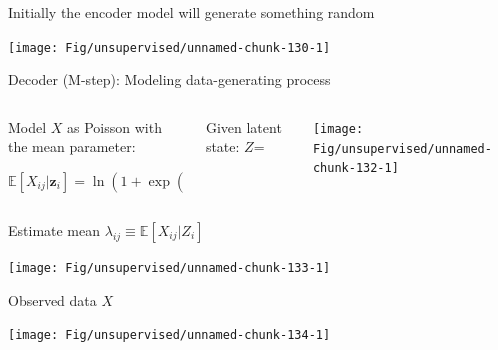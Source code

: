 \documentclass[
  ignorenonframetext,
  aspectratio=169]{beamer}
\begin{document}
\begin{frame}{Initially the encoder model will generate something
random}
\protect\hypertarget{initially-the-encoder-model-will-generate-something-random}{}
\scriptsize

\begin{center}\texttt{[image: Fig/unsupervised/unnamed-chunk-130-1]} \end{center}

\normalsize
\end{frame}

\begin{frame}{Decoder (M-step): Modeling data-generating process}
\protect\hypertarget{decoder-m-step-modeling-data-generating-process}{}
\scriptsize

\normalsize

\begin{columns}[T]
\begin{column}{.5\textwidth}
Model \(X\) as Poisson with the mean parameter:

\(\mathbb{E}\!\left[X_{ij} | \mathbf{z}_{i} \right] = \ln\left( 1 + \exp\left( \sum_{k} Z_{ik} W_{kj} \right) \right)\)
\end{column}

\begin{column}{.25\textwidth}
Given latent state: \(Z\)=
\end{column}

\begin{column}{.25\textwidth}
\scriptsize

\begin{center}\texttt{[image: Fig/unsupervised/unnamed-chunk-132-1]} \end{center}

\normalsize
\end{column}
\end{columns}

Estimate mean
\(\lambda_{ij} \equiv \mathbb{E}\!\left[X_{ij}|Z_{i}\right]\)

\scriptsize

\begin{center}\texttt{[image: Fig/unsupervised/unnamed-chunk-133-1]} \end{center}

\normalsize Observed data \(X\)

\scriptsize

\begin{center}\texttt{[image: Fig/unsupervised/unnamed-chunk-134-1]} \end{center}

\normalsize
\end{frame}
\end{document}
